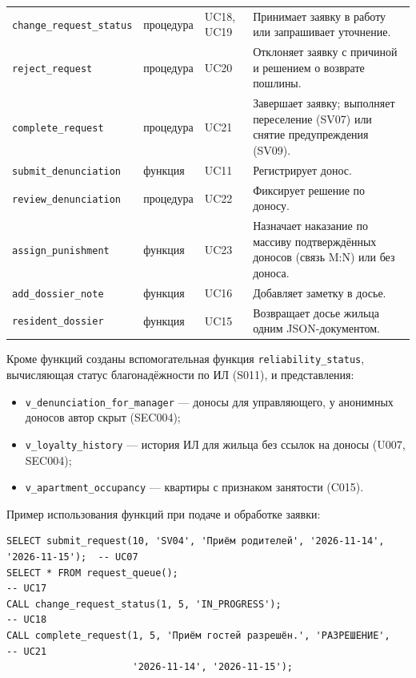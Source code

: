 \documentclass[12pt,a4paper]{article}
\begin{document}
\begin{longtable}{L{40.0mm} L{19.1mm} L{21.0mm} L{72.4mm}}
\texttt{change\_\allowbreak{}request\_\allowbreak{}status} & процедура & UC18, UC19 & Принимает заявку в работу или запрашивает уточнение. \\
\texttt{reject\_\allowbreak{}request} & процедура & UC20 & Отклоняет заявку с причиной и решением о возврате пошлины. \\
\texttt{complete\_\allowbreak{}request} & процедура & UC21 & Завершает заявку; выполняет переселение (SV07) или снятие предупреждения (SV09). \\
\texttt{submit\_\allowbreak{}denunciation} & функция & UC11 & Регистрирует донос. \\
\texttt{review\_\allowbreak{}denunciation} & процедура & UC22 & Фиксирует решение по доносу. \\
\texttt{assign\_\allowbreak{}punishment} & функция & UC23 & Назначает наказание по массиву подтверждённых доносов (связь M:N) или без доноса. \\
\texttt{add\_\allowbreak{}dossier\_\allowbreak{}note} & функция & UC16 & Добавляет заметку в досье. \\
\texttt{resident\_\allowbreak{}dossier} & функция & UC15 & Возвращает досье жильца одним JSON-документом. \\
\end{longtable}
Кроме функций созданы вспомогательная функция \texttt{reliability\_\allowbreak{}status}, вычисляющая статус
благонадёжности по ИЛ (S011), и представления:
\begin{itemize}
  \item \texttt{v\_\allowbreak{}denunciation\_\allowbreak{}for\_\allowbreak{}manager} --- доносы для управляющего, у анонимных доносов
        автор скрыт (SEC004);
  \item \texttt{v\_\allowbreak{}loyalty\_\allowbreak{}history} --- история ИЛ для жильца без ссылок на доносы (U007, SEC004);
  \item \texttt{v\_\allowbreak{}apartment\_\allowbreak{}occupancy} --- квартиры с признаком занятости (C015).
\end{itemize}

Пример использования функций при подаче и обработке заявки:
\begin{lstlisting}
SELECT submit_request(10, 'SV04', 'Приём родителей', '2026-11-14', '2026-11-15');  -- UC07
SELECT * FROM request_queue();                                                     -- UC17
CALL change_request_status(1, 5, 'IN_PROGRESS');                                   -- UC18
CALL complete_request(1, 5, 'Приём гостей разрешён.', 'РАЗРЕШЕНИЕ',                -- UC21
                      '2026-11-14', '2026-11-15');
\end{lstlisting}
\end{document}
